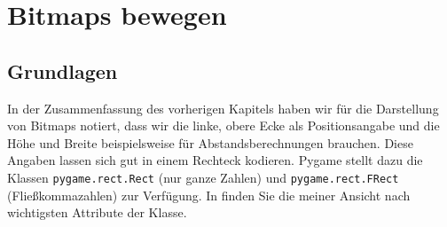 \newpage
\section{Bitmaps bewegen}
\subsection{Grundlagen}
In der Zusammenfassung des vorherigen Kapitels haben wir für die Darstellung von Bitmaps notiert, dass wir die linke, obere Ecke als Positionsangabe und die Höhe und Breite beispielsweise für Abstandsberechnungen brauchen. Diese Angaben lassen sich gut in einem Rechteck kodieren. Pygame stellt dazu die Klassen \texttt{pygame.rect.Rect} (nur ganze Zahlen) und \texttt{pygame.rect.FRect} (Fließkommazahlen) zur Verfügung. In  finden Sie die meiner Ansicht nach wichtigsten Attribute der Klasse.

